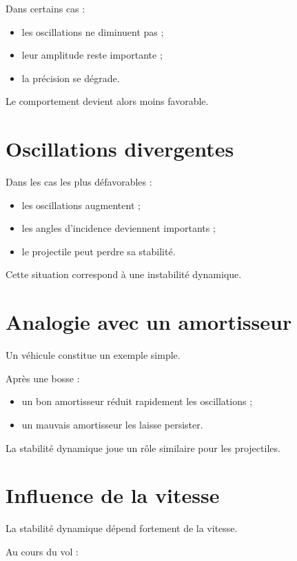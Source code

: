 Dans certains cas :

\begin{itemize}
    \item les oscillations ne diminuent pas ;
    \item leur amplitude reste importante ;
    \item la précision se dégrade.
\end{itemize}

Le comportement devient alors moins favorable.

\section{Oscillations divergentes}

Dans les cas les plus défavorables :

\begin{itemize}
    \item les oscillations augmentent ;
    \item les angles d'incidence deviennent importants ;
    \item le projectile peut perdre sa stabilité.
\end{itemize}

Cette situation correspond à une instabilité dynamique.

\section{Analogie avec un amortisseur}

Un véhicule constitue un exemple simple.

Après une bosse :

\begin{itemize}
    \item un bon amortisseur réduit rapidement les oscillations ;
    \item un mauvais amortisseur les laisse persister.
\end{itemize}

La stabilité dynamique joue un rôle similaire pour les projectiles.

\section{Influence de la vitesse}

La stabilité dynamique dépend fortement de la vitesse.

Au cours du vol :

